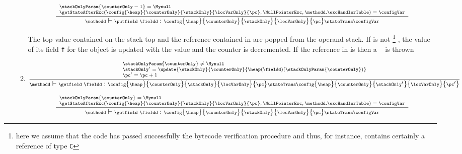 \begin{itemize}
\begin{enumerate}
		     
	    
           $${\scriptsize \frac{ \begin{array}{l}
	                 \stackOnlyParam{\counterOnly - 1} = \Mynull   \\
		         \getStateAfterExc( \config{\heap}{\counterOnly}{\stackOnly}{\locVarOnly}{\pc}, \NullPointerExc, \methodd.\excHandlerTable ) =  \configVar			                  \end{array}
                      }
		      {\methodd \vdash  \putfield \ \fieldd:  \config{\heap}{\counterOnly}{\stackOnly}{\locVarOnly}{\pc} 
					          \stateTrans  
						  \configVar }} $$
						        
        The top value contained on the stack top \stackOnlyParam{\counterOnly} and the reference contained in  
	are popped from the operand stack. If  is not \Mynull{} \footnote{here we assume that the code has passed successfully the bytecode verification procedure and thus,
	for instance,  contains certainly a reference        of type \texttt{C}  } , the value of its field 
	\texttt{f} for the object  is updated 
	with the value\stackOnlyParam{\counterOnly} and the counter \counterOnly is decremented.
	If the reference in  is \Mynull then a \NullPointerExc~ is thrown
          
        \item \getfield  
        	  
         $$ {\scriptsize \frac{ \begin{array}{l}
                               \stackOnlyParam{\counterOnly} \neq \Mynull \\
			             \stackOnly' =  \update{\stackOnly}{\counterOnly}{ \heap(\fieldd)(\stackOnlyParam{\counterOnly} ) }\\
			             \pc' = \pc + 1
	             \end{array}
                 }   
		 {\methodd \vdash  \getfield \ \fieldd  :  \config{\heap}{\counterOnly}{\stackOnly}{\locVarOnly}{\pc} 
						 \stateTrans  
						 \config{\heap}{\counterOnly}{\stackOnly'}{\locVarOnly}{\pc'}} } $$
			


        $${\scriptsize  \frac{ \begin{array}{l}
	                      \stackOnlyParam{\counterOnly} = \Mynull \\
			       \getStateAfterExc( \config{\heap}{\counterOnly}{\stackOnly}{\locVarOnly}{\pc}, \NullPointerExc, \methodd.\excHandlerTable ) =  \configVar                              \end{array}}
		  {\methodd \vdash  \getfield \ \fieldd  :  \config{\heap}{\counterOnly}{\stackOnly}{\locVarOnly}{\pc} 
						 \stateTrans  
						 \configVar} }$$
	 

\end{enumerate}
\end{itemize}
